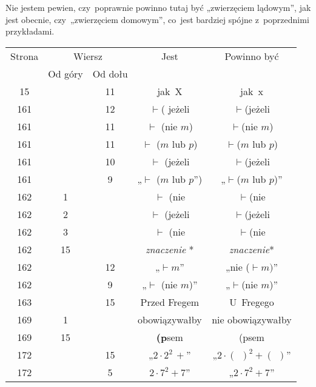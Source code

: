 \documentclass[a4paper,11pt]{article}
\begin{document}
\noindent
{} Nie jestem pewien, czy~poprawnie powinno tutaj
być „zwierzęciem lądowym”, jak jest obecnie, czy~„zwierzęciem
domowym”, co~jest bardziej spójne z~poprzednimi przykładami.

\vspace{\spaceFour}





\newpage



\begin{center}

  \begin{tabular}{|c|c|c|c|c|}
    \hline
    Strona & \multicolumn{2}{c|}{Wiersz} & Jest
                              & Powinno być \\ \cline{2-3}
    & Od góry & Od dołu & & \\
    \hline
    15  & & 11 & jak~X & jak~x \\
    161 & & 12 & $\vdash$({ } jeżeli & $\vdash$(jeżeli \\
    161 & & 11 & $\vdash$ (nie $m$) & $\vdash$(nie $m$) \\
    161 & & 11 & $\vdash$ ($m${ } lub $p$) & $\vdash$($m$ lub $p$) \\
    161 & & 10 & $\vdash$ (jeżeli & $\vdash$(jeżeli \\
    161 & &  9 & „$\vdash$ ($m$ lub $p$”)
           & „$\vdash$($m$ lub $p$)” \\
    162 &  1 & & $\vdash$ (nie & $\vdash$(nie \\
    162 &  2 & & $\vdash$ (jeżeli & $\vdash$(jeżeli \\
    162 &  3 & & $\vdash$ (nie & $\vdash$(nie \\
    162 & 15 & & \textit{znaczenie} * & \textit{znaczenie}* \\
    162 & & 12 & „$\vdash m$” & „nie ($\vdash m)$” \\
    162 & &  9 & „$\vdash$ (nie $m$)” & „$\vdash$(nie $m$)” \\
    163 & & 15 & Przed Fregem & U~Fregego \\
    169 &  1 & & obowiązywałby & nie obowiązywałby \\
    169 & 15 & & \textbf{(p}sem & (psem \\
    172 & & 15 & „$2 \cdot 2^{ 2 } \, +$”
           & „$2 \cdot ( \:\: )^{ 2 } + ( \:\: )$” \\
    172 & &  5 & $2 \cdot 7^{ 2 } + 7$” & „$2 \cdot 7^{ 2 } + 7$” \\

\end{tabular}
\end{center}
\end{document}
